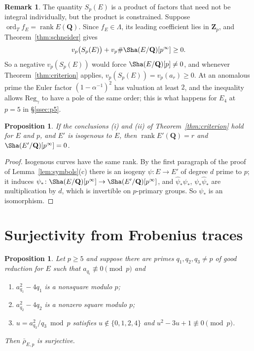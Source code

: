 \documentclass[11pt]{amsart}
\newtheorem{proposition}[theorem]{Proposition}
\theoremstyle{definition}
\newtheorem{remark}[theorem]{Remark}
\newcommand{\Q}{\mathbf{Q}}
\newcommand{\Zp}{\mathbf{Z}_p}
\newcommand{\Reg}{\mathrm{Reg}}
\newcommand{\rk}{\operatorname{rank}}
\newcommand{\ord}{\operatorname{ord}}
\newcommand{\rhobar}{\bar\rho_{E,p}}
\begin{document}
\begin{remark}\label{rem:integral}
The quantity $S_p(E)$ is a product of factors that need not be integral individually, but the product is constrained. Suppose $\ord_Tf_E=\rk E(\Q)$. Since $f_E\in\Lambda$, its leading coefficient lies in $\Zp$, and Theorem~\ref{thm:schneider} gives
\[
v_p\bigl(S_p(E)\bigr)+v_p\#\Sha(E/\Q)[p^\infty]\ge0 .
\]
So a negative $v_p(S_p(E))$ would force $\Sha(E/\Q)[p]\ne0$, and whenever Theorem~\ref{thm:criterion} applies, $v_p(S_p(E))=v_p(a_r)\ge0$. At an anomalous prime the Euler factor $(1-\alpha^{-1})^2$ has valuation at least $2$, and the inequality allows $\Reg_\gamma$ to have a pole of the same order; this is what happens for $E_4$ at $p=5$ in \S\ref{ssec:p5}.
\end{remark}

\begin{proposition}\label{prop:isogeny}
If the conclusions (i) and (ii) of Theorem~\ref{thm:criterion} hold for $E$ and $p$, and $E'$ is isogenous to $E$, then $\rk E'(\Q)=r$ and $\Sha(E'/\Q)[p^\infty]=0$.
\end{proposition}

\begin{proof}
Isogenous curves have the same rank. By the first paragraph of the proof of Lemma~\ref{lem:symbols}(c) there is an isogeny $\psi\colon E\to E'$ of degree $d$ prime to $p$; it induces $\psi_*\colon\Sha(E/\Q)[p^\infty]\to\Sha(E'/\Q)[p^\infty]$, and $\hat\psi_*\psi_*$, $\psi_*\hat\psi_*$ are multiplication by $d$, which is invertible on $p$-primary groups. So $\psi_*$ is an isomorphism.
\end{proof}

\section{Surjectivity from Frobenius traces}\label{sec:surj}

\begin{proposition}\label{prop:surj}
Let $p\ge5$ and suppose there are primes $q_1,q_2,q_3\ne p$ of good reduction for $E$ such that $a_{q_i}\not\equiv0\pmod p$ and
\begin{enumerate}
\item[(1)] $a_{q_1}^2-4q_1$ is a nonsquare modulo $p$;
\item[(2)] $a_{q_2}^2-4q_2$ is a nonzero square modulo $p$;
\item[(3)] $u=a_{q_3}^2/q_3\bmod p$ satisfies $u\notin\{0,1,2,4\}$ and $u^2-3u+1\not\equiv0\pmod p$.
\end{enumerate}
Then $\rhobar$ is surjective.
\end{proposition}
\end{document}
